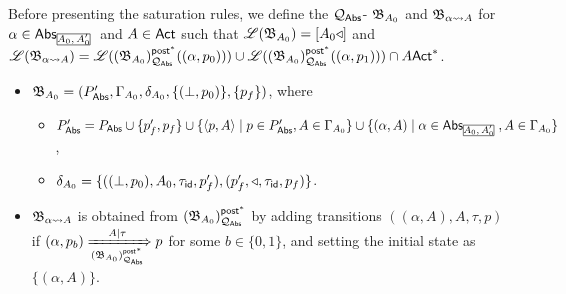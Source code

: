 Before presenting the saturation rules, we define the ${\mathcal{Q} }_{{\mathsf{Abs} }}$-{\WOTrNFA} ${\mathfrak{B} }_{A_0}$ and ${\mathfrak{B} }_{\alpha\rightsquigarrow A}$ for $\alpha\in\abs_{\mhcancel{A_0,A_0'}}$ and $A\in{\sf Act}$ such that ${\mathscr{L} }({\mathfrak{B} }_{A_0}) = [A_0\triangleleft]$ and ${\mathscr{L} }({\mathfrak{B} }_{\alpha\rightsquigarrow A}) = {\mathscr{L} }(({\mathfrak{B} }_{A_0})^{{\mathsf{post} }^*}_{{\mathcal{Q} }_{{\mathsf{Abs} }}}((\alpha,p_0)))\cup{\mathscr{L} }(({\mathfrak{B} }_{A_0})^{{\mathsf{post} }^*}_{{\mathcal{Q} }_{{\mathsf{Abs} }}}((\alpha,p_1)))\cap A{\sf Act}^*$.
\begin{itemize}
    \item ${\mathfrak{B} }_{A_0} = (P_{{\mathsf{Abs} }}', \Gamma_{A_0},\delta_{A_0}, \{(\bot,p_0)\}, \{p_f\})$, where
    \begin{itemize}
        \item $P_{\abs}' = P_{\abs}\cup \{p_f',p_f\} \cup \{\langle p, A\rangle\mid p\in P_{\abs}' ,A\in\Gamma_{A_0}\} \cup \{(\alpha,A)\mid\alpha\in\abs_{\mhcancel{A_0,A_0'}}, A\in\Gamma_{A_0}\}$,
        \item $\delta_{A_0} = \{((\bot, p_0), A_0, \tau_{\mathsf{id}}, p_f'),(p_f',\triangleleft,\tau_{\mathsf{id}},p_f)\}$.
    \end{itemize}
    \item ${\mathfrak{B} }_{\alpha\rightsquigarrow A}$ is obtained from $({\mathfrak{B} }_{A_0})^{{\mathsf{post} }^*}_{{\mathcal{Q} }_{{\mathsf{Abs} }}}$ by adding transitions $((\alpha, A), A, \tau, p)$ if $(\alpha, p_b)\xRightarrow[({\mathfrak{B} }_{A_0})^{{\mathsf{post} }^*}_{{\mathcal{Q} }_{{\mathsf{Abs} }}}]{A\mid\tau}p$ for some $b\in\{0, 1\}$, and setting the initial state as $\{(\alpha, A)\}$.
\end{itemize}


